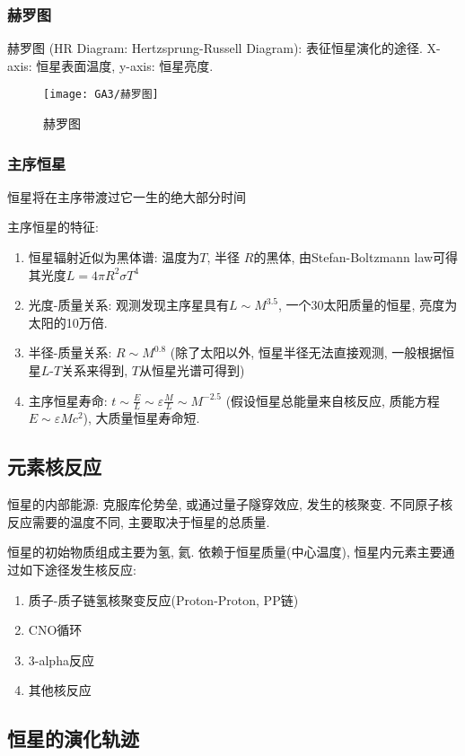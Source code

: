 \subsubsection{赫罗图}
赫罗图 (HR Diagram: Hertzsprung-Russell Diagram): 表征恒星演化的途径. X-axis: 恒星表面温度, y-axis: 恒星亮度. 

\begin{figure}[!htb]
    \centering
    \texttt{[image: GA3/赫罗图]}
    \caption{赫罗图}
\end{figure}

\subsubsection{主序恒星}
恒星将在主序带渡过它一生的绝大部分时间

主序恒星的特征: 
\begin{enumerate}
    \item 恒星辐射近似为黑体谱: 温度为$T$, 半径 $R$的黑体, 由Stefan-Boltzmann law可得其光度$L=4\pi R^2 \sigma T^4$
    \item 光度-质量关系: 观测发现主序星具有$L\sim M^{3.5}$, 一个30太阳质量的恒星, 亮度为太阳的10万倍. 
    \item 半径-质量关系: $R\sim M^{0.8}$ (除了太阳以外, 恒星半径无法直接观测, 一般根据恒星$L$-$T$关系来得到, $T$从恒星光谱可得到)
    \item 主序恒星寿命: $t\sim \frac{E}{L}\sim \varepsilon \frac{M}{L} \sim M^{-2.5} $ (假设恒星总能量来自核反应, 质能方程$E\sim \varepsilon Mc^2$), 大质量恒星寿命短.     
\end{enumerate}

\subsection{元素核反应}
恒星的内部能源: 克服库伦势垒, 或通过量子隧穿效应, 发生的核聚变. 不同原子核反应需要的温度不同, 主要取决于恒星的总质量.   

恒星的初始物质组成主要为氢, 氦. 依赖于恒星质量(中心温度), 恒星内元素主要通过如下途径发生核反应: 
\begin{enumerate}
    \item 质子-质子链氢核聚变反应(Proton-Proton, PP链) 
    \item CNO循环
    \item 3-alpha反应
    \item 其他核反应
\end{enumerate}


\subsection{恒星的演化轨迹}
